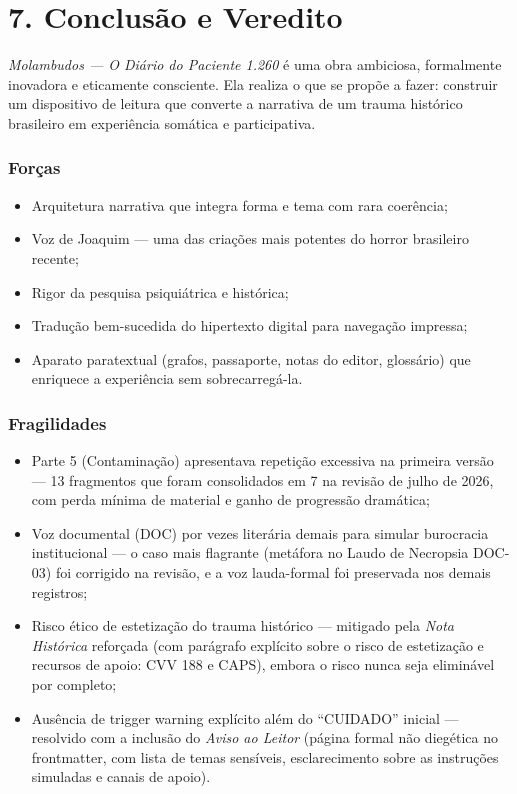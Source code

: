 \documentclass[14pt,openany]{extbook}
\begin{document}
\chapter*{7. Conclusão e Veredito}

\noindent\textit{Molambudos --- O Diário do Paciente 1.260} é uma obra ambiciosa, formalmente inovadora e eticamente consciente. Ela realiza o que se propõe a fazer: construir um dispositivo de leitura que converte a narrativa de um trauma histórico brasileiro em experiência somática e participativa.

\subsection*{Forças}

\begin{itemize}
\item Arquitetura narrativa que integra forma e tema com rara coerência;
\item Voz de Joaquim --- uma das criações mais potentes do horror brasileiro recente;
\item Rigor da pesquisa psiquiátrica e histórica;
\item Tradução bem-sucedida do hipertexto digital para navegação impressa;
\item Aparato paratextual (grafos, passaporte, notas do editor, glossário) que enriquece a experiência sem sobrecarregá-la.
\end{itemize}

\subsection*{Fragilidades}

\begin{itemize}
\item Parte 5 (Contaminação) apresentava repetição excessiva na primeira versão --- 13 fragmentos que foram consolidados em 7 na revisão de julho de 2026, com perda mínima de material e ganho de progressão dramática;
\item Voz documental (DOC) por vezes literária demais para simular burocracia institucional --- o caso mais flagrante (metáfora no Laudo de Necropsia DOC-03) foi corrigido na revisão, e a voz lauda-formal foi preservada nos demais registros;
\item Risco ético de estetização do trauma histórico --- mitigado pela \textit{Nota Histórica} reforçada (com parágrafo explícito sobre o risco de estetização e recursos de apoio: CVV 188 e CAPS), embora o risco nunca seja eliminável por completo;
\item Ausência de trigger warning explícito além do ``CUIDADO'' inicial --- resolvido com a inclusão do \textit{Aviso ao Leitor} (página formal não diegética no frontmatter, com lista de temas sensíveis, esclarecimento sobre as instruções simuladas e canais de apoio).
\end{itemize}
\end{document}
